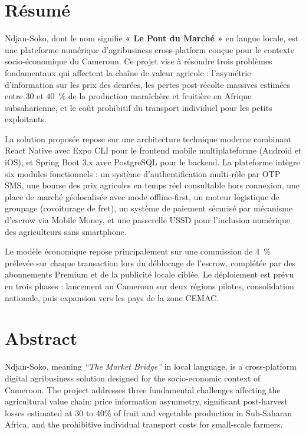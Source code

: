 \documentclass[12pt,a4paper]{report}
\begin{document}
\chapter*{Résumé}

Ndjan-Soko, dont le nom signifie \textbf{« Le Pont du Marché »} en langue locale, est une plateforme numérique d'agribusiness cross-platform conçue pour le contexte socio-économique du Cameroun. Ce projet vise à résoudre trois problèmes fondamentaux qui affectent la chaîne de valeur agricole : l'asymétrie d'information sur les prix des denrées, les pertes post-récolte massives estimées entre 30 et 40~\% de la production maraîchère et fruitière en Afrique subsaharienne, et le coût prohibitif du transport individuel pour les petits exploitants.

La solution proposée repose sur une architecture technique moderne combinant React Native avec Expo CLI pour le frontend mobile multiplateforme (Android et iOS), et Spring Boot 3.x avec PostgreSQL pour le backend. La plateforme intègre six modules fonctionnels : un système d'authentification multi-rôle par OTP SMS, une bourse des prix agricoles en temps réel consultable hors connexion, une place de marché géolocalisée avec mode offline-first, un moteur logistique de groupage (covoiturage de fret), un système de paiement sécurisé par mécanisme d'escrow via Mobile Money, et une passerelle USSD pour l'inclusion numérique des agriculteurs sans smartphone.

Le modèle économique repose principalement sur une commission de 4~\% prélevée sur chaque transaction lors du déblocage de l'escrow, complétée par des abonnements Premium et de la publicité locale ciblée. Le déploiement est prévu en trois phases : lancement au Cameroun sur deux régions pilotes, consolidation nationale, puis expansion vers les pays de la zone CEMAC.

\chapter*{Abstract}

Ndjan-Soko, meaning \textit{``The Market Bridge''} in local language, is a cross-platform digital agribusiness solution designed for the socio-economic context of Cameroon. The project addresses three fundamental challenges affecting the agricultural value chain: price information asymmetry, significant post-harvest losses estimated at 30 to 40\% of fruit and vegetable production in Sub-Saharan Africa, and the prohibitive individual transport costs for small-scale farmers.
\end{document}
